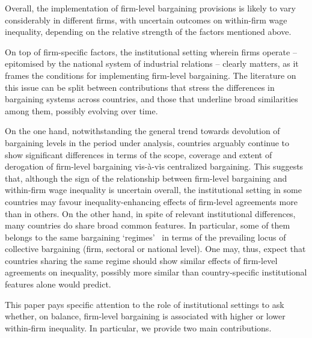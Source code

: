 \documentclass[Review,times,sageh,11pt]{sagej}
\begin{document}
Overall, the implementation of firm-level bargaining provisions is likely to vary considerably in different firms, with uncertain outcomes on within-firm wage inequality, depending on the relative strength of the factors mentioned above.

On top of firm-specific factors, the institutional setting wherein firms operate -- epitomised by the national system of industrial relations -- clearly matters, as it frames the conditions for implementing firm-level bargaining. The literature on this issue can be split between contributions that stress the differences in bargaining systems across countries, and those that underline broad similarities among them, possibly evolving over time.

On the one hand, notwithstanding the general trend towards devolution of bargaining levels in the period under analysis, countries arguably continue to show significant differences in terms of the scope, coverage and extent of derogation of firm-level bargaining vis-à-vis centralized bargaining. This suggests that, although the sign of the relationship between firm-level bargaining and within-firm wage inequality is uncertain overall, the institutional setting in some countries may favour inequality-enhancing effects of firm-level agreements more than in others. On the other hand, in spite of relevant institutional differences, many countries do share broad common features. In particular, some of them belongs to the same bargaining ‘regimes’~\citep{fulton.2013} in terms of the prevailing locus of collective bargaining (firm, sectoral or national level). One may, thus, expect that countries sharing the same regime should show similar effects of firm-level agreements on inequality, possibly more similar than country-specific institutional features alone would predict. 

This paper pays specific attention to the role of institutional settings to ask whether, on balance, firm-level bargaining is associated with higher or lower within-firm inequality. In particular, we provide two main contributions.
\end{document}
